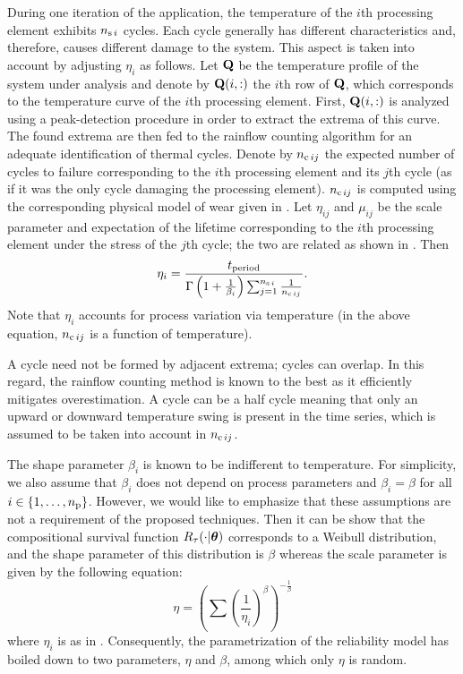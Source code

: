 During one iteration of the application, the temperature of the $i$th processing element exhibits $\nsegments[i]$ cycles.
Each cycle generally has different characteristics and, therefore, causes different damage to the system.
This aspect is taken into account by adjusting $\eta_i$ as follows.
Let $\mQ$ be the temperature profile of the system under analysis and denote by $\mQ(i, :)$ the $i$th row of $\mQ$, which corresponds to the temperature curve of the $i$th processing element.
First, $\mQ(i, :)$ is analyzed using a peak-detection procedure in order to extract the extrema of this curve.
The found extrema are then fed to the rainflow counting algorithm \cite{xiang2010} for an adequate identification of thermal cycles.
Denote by $\ncycles[ij]$ the expected number of cycles to failure corresponding to the $i$th processing element and its $j$th cycle (as if it was the only cycle damaging the processing element).
$\ncycles[ij]$ is computed using the corresponding physical model of wear given in \cite{jedec2011, xiang2010}.
Let $\eta_{ij}$ and $\mu_{ij}$ be the scale parameter and expectation of the lifetime corresponding to the $i$th processing element under the stress of the $j$th cycle; the two are related as shown in .
Then \cite{ukhov2012, xiang2010}
\begin{equation} \elab{weibull-eta}
  \eta_i = \frac{\period}{\Gamma\left(1 + \frac{1}{\beta_i}\right) \sum_{j = 1}^{\nsegments[i]} \frac{1}{\ncycles[ij]}}.
\end{equation}
Note that $\eta_i$ accounts for process variation via temperature (in the above equation, $\ncycles[ij]$ is a function of temperature).

\begin{remark} 
A cycle need not be formed by adjacent extrema; cycles can overlap.
In this regard, the rainflow counting method is known to the best as it efficiently mitigates overestimation.
A cycle can be a half cycle meaning that only an upward or downward temperature swing is present in the time series, which is assumed to be taken into account in $\ncycles[ij]$.
\end{remark}

The shape parameter $\beta_i$ is known to be indifferent to temperature.
For simplicity, we also assume that $\beta_i$ does not depend on process parameters and $\beta_i = \beta$ for all $i \in \{ 1, \dotsc, \nprocs \}$.
However, we would like to emphasize that these assumptions are not a requirement of the proposed techniques.
Then it can be show that the compositional survival function $\survival_\T(\cdot | \pvw)$ corresponds to a Weibull distribution, and the shape parameter of this distribution is $\beta$ whereas the scale parameter is given by the following equation:
\[
  \eta = \left(\sum \left( \frac{1}{\eta_i} \right)^\beta \right)^{-\frac{1}{\beta}}
\]
where $\eta_i$ is as in .
Consequently, the parametrization of the reliability model has boiled down to two parameters, $\eta$ and $\beta$, among which only $\eta$ is random.

